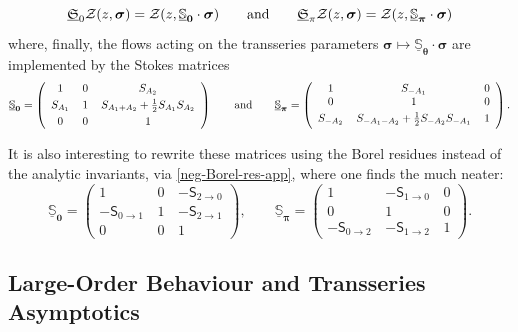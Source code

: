 \documentclass[11pt,a4paper]{article}
\newcommand{\CZ}{{\cal Z}}
\def\BS{{\mathbb S}}
\newcommand{\be}{\begin{equation}}
\newcommand{\ee}{\end{equation}}
\begin{document}
%
\be
\underline{\mathfrak{S}}_0 \CZ (z, \boldsymbol{\sigma}) = \CZ (z, \boldsymbol{\underline{\BS}_0} \cdot \boldsymbol{\sigma}) \qquad \text{and} \qquad \underline{\mathfrak{S}}_\pi \CZ (z, \boldsymbol{\sigma}) = \CZ (z, \boldsymbol{\underline{\BS}_\pi} \cdot \boldsymbol{\sigma})
\ee
%
\noindent
where, finally, the flows acting on the transseries parameters $\boldsymbol{\sigma} \mapsto \boldsymbol{\underline{\BS}_{\theta}} \cdot \boldsymbol{\sigma}$ are implemented by the Stokes matrices
%
\be
\boldsymbol{\underline{\BS}_0} = \left(
\begin{array}{ccc}
1 & \,0\, & S_{A_2} \\
S_{A_1} & \,1\, & S_{A_1+A_2} + \frac{1}{2} S_{A_1} S_{A_2}\vphantom{\frac{\frac{1}{2}}{\frac{1}{2}}} \\
0 & \,0\, & 1
\end{array}
\right)
\qquad \text{and} \qquad
\boldsymbol{\underline{\BS}_\pi} = \left(
\begin{array}{ccc}
1\, & S_{-A_1} & \,0 \\
0\, & 1 & \,0 \\
S_{-A_2}\, & S_{-A_1-A_2} + \frac{1}{2} S_{-A_2} S_{-A_1}\vphantom{\frac{\frac{1}{2}}{\frac{1}{2}}} & \,1
\end{array}
\right).
\ee

It is also interesting to rewrite these matrices using the Borel residues instead of the analytic invariants, via \eqref{neg-Borel-res-app}, where one finds the much neater:
%
\be
\boldsymbol{\underline{\BS}_0} = \left(
\begin{array}{ccc}
1 & \,0\, & -\mathsf{S}_{2\to0} \\
-\mathsf{S}_{0\to1} & \,1\, & -\mathsf{S}_{2\to1} \\
0 & \,0\, & 1
\end{array}
\right),
\qquad
\boldsymbol{\underline{\BS}_\pi} = \left(
\begin{array}{ccc}
1\, & -\mathsf{S}_{1\to0} & \,0 \\
0\, & 1 & \,0 \\
-\mathsf{S}_{0\to2}\, & -\mathsf{S}_{1\to2} & \,1
\end{array}
\right).
\ee

\subsection*{Large-Order Behaviour and Transseries Asymptotics}
\end{document}
